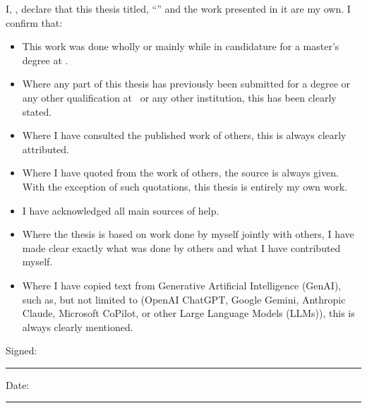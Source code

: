\documentclass[
11pt, %
english, %
singlespacing, %
headsepline, %
]{MastersDoctoralThesis} %
\begin{document}
\begin{declaration}
\addchaptertocentry{\authorshipname} %
\noindent I, \authorname, declare that this thesis titled, \enquote{\ttitle} and the work presented in it are my own. I confirm that:

\begin{itemize} 
\item This work was done wholly or mainly while in candidature for a master's degree at \univname.
\item Where any part of this thesis has previously been submitted for a degree or any other qualification at \univname \, or any other institution, this has been clearly stated.
\item Where I have consulted the published work of others, this is always clearly attributed.
\item Where I have quoted from the work of others, the source is always given. With the exception of such quotations, this thesis is entirely my own work.
\item I have acknowledged all main sources of help.
\item Where the thesis is based on work done by myself jointly with others, I have made clear exactly what was done by others and what I have contributed myself.
\item Where I have copied text from Generative Artificial Intelligence (GenAI), such as, but not limited to (OpenAI ChatGPT, Google Gemini, Anthropic Claude, Microsoft CoPilot, or other Large Language Models (LLMs)), this is always clearly mentioned.
\\


\end{itemize}
 
\noindent Signed:\\
\rule[0.5em]{25em}{0.5pt} %
 
\noindent Date:\\
\rule[0.5em]{25em}{0.5pt} %
\end{declaration}

\cleardoublepage


\end{document}
